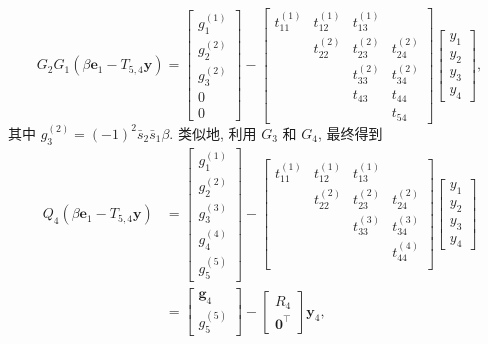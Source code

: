 \[G_2G_1(\beta\bm e_1-T_{5,4}\bm y)=\begin{bmatrix}g_1^{(1)}\\g_2^{(2)}\\g_3^{(2)}\\0\\0\end{bmatrix}
-\begin{bmatrix}t_{11}^{(1)}&t_{12}^{(1)}&t_{13}^{(1)}&\\&t_{22}^{(2)}&t_{23}^{(2)}&t_{24}^{(2)}\\&&t_{33}^{(2)}&t_{34}^{(2)}\\&&t_{43}&t_{44}\\&&&t_{54}\end{bmatrix}\begin{bmatrix}y_1\\y_2\\y_3\\y_4\end{bmatrix},\]
{其中 $g_3^{(2)}=(-1)^2\bar s_2\bar s_1\beta$. 类似地, 利用 $G_3$ 和 $G_4$, 最终得到}
\[\begin{aligned}
Q_4(\beta\bm e_1-T_{5,4}\bm y)&=\begin{bmatrix}g_1^{(1)}\\g_2^{(2)}\\g_3^{(3)}\\g_4^{(4)}\\g_5^{(5)}\end{bmatrix}
-\begin{bmatrix}t_{11}^{(1)}&t_{12}^{(1)}&t_{13}^{(1)}&\\&t_{22}^{(2)}&t_{23}^{(2)}&t_{24}^{(2)}\\&&t_{33}^{(3)}&t_{34}^{(3)}\\&&&t_{44}^{(4)}\\&&&\end{bmatrix}\begin{bmatrix}y_1\\y_2\\y_3\\y_4\end{bmatrix}\\
&=\begin{bmatrix}\bm g_4\\g_5^{(5)}\end{bmatrix}-\begin{bmatrix}R_4\\\bm0^{\top}\end{bmatrix}\bm y_4,
\end{aligned}\]
